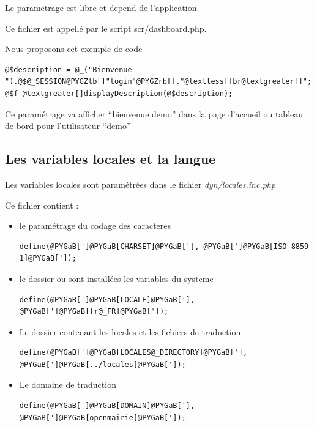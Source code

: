 \documentclass[letterpaper,10pt,french]{manual}
\begin{document}
Le parametrage est libre et depend de l'application.

Ce fichier est appellé par le script scr/dashboard.php.

Nous proposons cet exemple de code

\begin{Verbatim}[commandchars=@\[\]]
@$description = @_("Bienvenue ").@$@_SESSION@PYGZlb[]"login"@PYGZrb[]."@textless[]br@textgreater[]";
@$f-@textgreater[]displayDescription(@$description);
\end{Verbatim}

Ce paramétrage va afficher ``bienvenue demo'' dans la page d'accueil ou
tableau de bord pour l'utilisateur ``demo''


\subsection{Les variables locales et la langue}

Les variables locales sont paramétrées dans le fichier \emph{dyn/locales.inc.php}

Ce fichier contient :
\begin{itemize}
\item {} 
le paramétrage du codage des caracteres

\begin{Verbatim}[commandchars=@\[\]]
define(@PYGaB[']@PYGaB[CHARSET]@PYGaB['], @PYGaB[']@PYGaB[ISO-8859-1]@PYGaB[']);
\end{Verbatim}

\item {} 
le dossier ou sont installées les variables du systeme

\begin{Verbatim}[commandchars=@\[\]]
define(@PYGaB[']@PYGaB[LOCALE]@PYGaB['], @PYGaB[']@PYGaB[fr@_FR]@PYGaB[']);
\end{Verbatim}

\item {} 
Le dossier contenant les locales et les fichiers de traduction

\begin{Verbatim}[commandchars=@\[\]]
define(@PYGaB[']@PYGaB[LOCALES@_DIRECTORY]@PYGaB['], @PYGaB[']@PYGaB[../locales]@PYGaB[']);
\end{Verbatim}

\item {} 
Le domaine de traduction

\begin{Verbatim}[commandchars=@\[\]]
define(@PYGaB[']@PYGaB[DOMAIN]@PYGaB['], @PYGaB[']@PYGaB[openmairie]@PYGaB[']);
\end{Verbatim}

\end{itemize}
\end{document}
